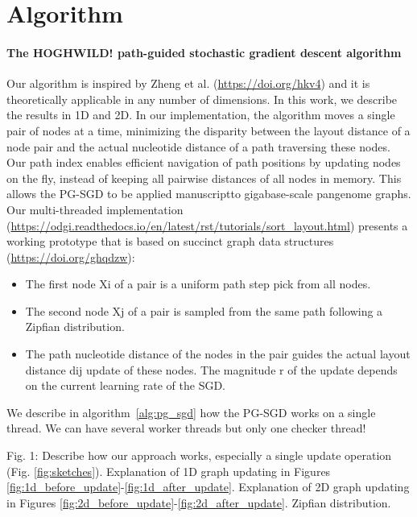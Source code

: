 \documentclass{bioinfo}
\theoremstyle{definition}
\begin{document}
\section{Algorithm}

\paragraph{The HOGHWILD! path-guided stochastic gradient descent algorithm}
Our algorithm is inspired by Zheng et al. (\url{https://doi.org/hkv4}) and it is theoretically applicable in any number of dimensions.
In this work, we describe the results in 1D and 2D.
In our implementation, the algorithm moves a single pair of nodes at a time, minimizing the disparity between the layout distance of a node pair and the actual nucleotide distance of a path traversing these nodes.
Our path index enables efficient navigation of path positions by updating nodes on the fly, instead of keeping all pairwise distances of all nodes in memory.
This allows the PG-SGD to be applied manuscriptto gigabase-scale pangenome graphs. \\
Our multi-threaded implementation (\url{https://odgi.readthedocs.io/en/latest/rst/tutorials/sort_layout.html}) presents a working prototype that is based on succinct graph data structures (\url{https://doi.org/ghqdzw}):
\begin{itemize}
	\item The first node Xi of a pair is a uniform path step pick from all nodes.
	\item The second node Xj of a pair is sampled from the same path following a Zipfian distribution. 
	\item The path nucleotide distance of the nodes in the pair guides the actual layout distance dij update of these nodes. The magnitude r of the update depends on the current learning rate of the SGD.
\end{itemize}
We describe in algorithm~\ref{alg:pg_sgd} how the PG-SGD works on a single thread. We can have several worker threads but only one checker thread!



\iffalse
Fig. 1: Describe how our approach works, especially a single update operation (Fig. \ref{fig:sketches}). Explanation of 1D graph updating in Figures \ref{fig:1d_before_update}-\ref{fig:1d_after_update}. Explanation of 2D graph updating in Figures \ref{fig:2d_before_update}-\ref{fig:2d_after_update}. Zipfian distribution.
\end{document}

